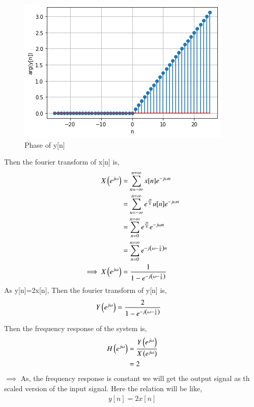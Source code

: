 \documentclass[journal,12pt,twocolumn]{IEEEtran}
\begin{document}
\begin{figure}[!htp]
    \centering
    \includegraphics[width = \columnwidth]{4.PNG}
    \caption{Phase of y[n]}
    \label{f4}
\end{figure}


Then the fourier transform of x[n] is,
\begin{align}
    X\left(e^{j\omega}\right)&=\sum\limits_{n=-\infty}^{n=\infty}x[n]e^{-j\omega n}\\
    &=\sum\limits_{n=-\infty}^{n=\infty}e^{\frac{jn}{8}}u[n]e^{-j\omega n}\\
    &=\sum\limits_{n=0}^{n=\infty}e^{\frac{jn}{8}}e^{-j\omega n}\\
    &=\sum\limits_{n=0}^{n=\infty}e^{-j\left(\omega-\frac{1}{8}\right) n}\\
    \implies X\left(e^{j\omega}\right)&=\frac{1}{1-e^{-j\left(\omega-\frac{1}{8}\right)}}
\end{align}
As y[n]=2x[n],
Then the fourier transform of y[n] is,
\begin{align}
    Y\left(e^{j\omega}\right)&=\frac{2}{1-e^{-j\left(\omega-\frac{1}{8}\right)}}
\end{align}

Then the frequency response of the system is,
\begin{align}
    H\left(e^{j\omega}\right)&=\frac{Y\left(e^{j\omega}\right)}{X\left(e^{j\omega}\right)}\\
    &=2
\end{align}
$\implies$ As, the frequency response is constant we will get the output signal as th scaled version of the input signal. Here the relation will be like,
\begin{align}
    y[n]=2x[n]
\end{align}
\end{document}
